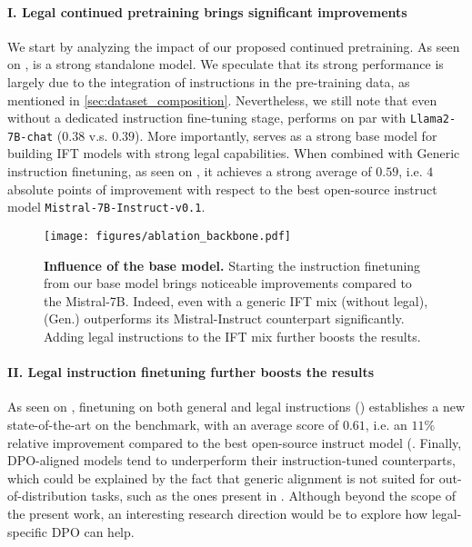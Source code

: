\paragraph{I. Legal continued pretraining brings significant improvements} We start by analyzing the impact of our proposed continued pretraining. As seen on , \ourmodel{} is a strong standalone model. We speculate that its strong performance is largely due to the integration of instructions in the pre-training data, as mentioned in \autoref{sec:dataset_composition}. Nevertheless, we still note that even without a dedicated instruction fine-tuning stage, \ourmodel{} performs on par with \texttt{Llama2-7B-chat} ($0.38$ v.s. $0.39$). More importantly, \ourmodel{} serves as a strong base model for building IFT models with strong legal capabilities. When combined with Generic instruction finetuning, as seen on , it achieves a strong average of $0.59$, i.e. $4$ absolute points of improvement with respect to the best open-source instruct model \texttt{Mistral-7B-Instruct-v0.1}.

\begin{figure}
    \centering
    \texttt{[image: figures/ablation\_backbone.pdf]}
    \caption{\textbf{Influence of the base model.} Starting the instruction finetuning from our base model \ourmodel{} brings noticeable improvements compared to the Mistral-7B. Indeed, even with a generic IFT mix (without legal), \ourmodel{} (Gen.) outperforms its Mistral-Instruct counterpart significantly. Adding legal instructions to the IFT mix further boosts the results.} 
    \label{fig:ablation_backbones}
\end{figure}

\paragraph{II. Legal instruction finetuning further boosts the results} As seen on , finetuning \ourmodel{} on both general and legal instructions (\ourmodelift{}) establishes a new state-of-the-art on the \legalbench{} benchmark, with an average score of $0.61$, i.e. an $11$\% relative improvement compared to the best open-source instruct model (. 
Finally, DPO-aligned models tend to underperform their instruction-tuned counterparts, which could be explained by the fact that generic alignment is not suited for out-of-distribution tasks, such as the ones present in \legalbench{}. Although beyond the scope of the present work, an interesting research direction would be to explore how legal-specific DPO can help.

